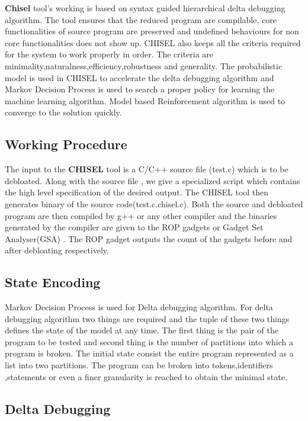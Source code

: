 \documentclass{relatorio}
\begin{document}
\textbf{Chisel} tool's working is based on syntax guided hierarchical delta debugging algorithm. The tool ensures that the reduced program are compilable, core functionalities of source program are preserved  and undefined behaviours for non core functionalities does not show up. CHISEL also keeps all the criteria required for the system to work properly in order. The criteria are minimality,naturalness,efficiency,robustness and generality. The probabilistic model is used in CHISEL to accelerate the delta debugging algorithm and Markov Decision Process is used to search a proper policy for learning the machine learning algorithm. Model based Reinforcement algorithm is used to converge to the solution quickly.

\subsection{Working Procedure}%
\label{Tools}

The input to the \textbf{CHISEL} tool is a C/C++ source file (test.c) which is to be debloated. Along with the source file , we give a specialized script which contains the high level specification of the desired output. The CHISEL tool then generates binary of the source code(test.c.chisel.c). Both the source and debloated program are then compiled by g++ or any other compiler and the binaries generated by the compiler are given to the ROP gadgets or Gadget Set Analyser(GSA) . The ROP gadget outputs the count of the  gadgets before and after debloating respectively.

\subsection{State Encoding}%
\label{Tools}

Markov Decision Process is used for Delta debugging algorithm. For  delta debugging algorithm two things are required and the tuple of these two things defines the state of the model at any time. The first thing is the pair of the program to be tested and second thing is the number of partitions into which a program is broken. The initial state consist the entire program  represented as a list into two partitions. The program can be broken into tokens,identifiers ,statements or even a finer granularity is reached to obtain the minimal state.

\subsection{Delta Debugging}%
\label{Tools}
\end{document}
